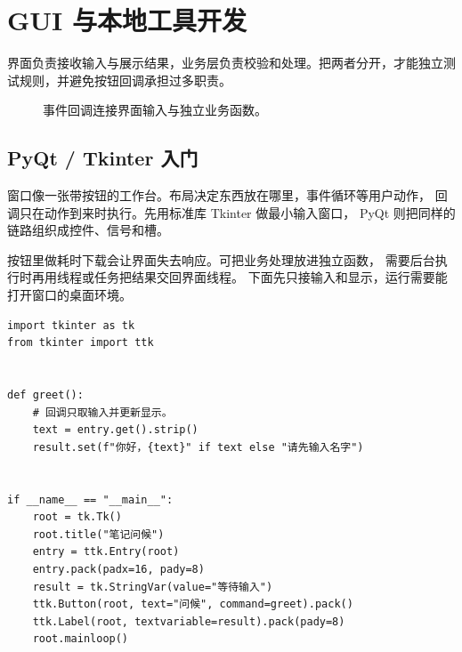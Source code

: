 \chapter{GUI 与本地工具开发}
\label{ch:15-outline}

界面负责接收输入与展示结果，业务层负责校验和处理。把两者分开，才能独立测试规则，并避免按钮回调承担过多职责。


\begin{figure}[htbp]
  \centering
  \caption*{事件回调连接界面输入与独立业务函数。}
\end{figure}


\section{PyQt / Tkinter 入门}

窗口像一张带按钮的工作台。布局决定东西放在哪里，事件循环等用户动作，
回调只在动作到来时执行。先用标准库 Tkinter 做最小输入窗口，
PyQt 则把同样的链路组织成控件、信号和槽。

按钮里做耗时下载会让界面失去响应。可把业务处理放进独立函数，
需要后台执行时再用线程或任务把结果交回界面线程。
下面先只接输入和显示，运行需要能打开窗口的桌面环境。


\begin{lstlisting}[title={\code{window_demo.py}}]
import tkinter as tk
from tkinter import ttk


def greet():
    # 回调只取输入并更新显示。
    text = entry.get().strip()
    result.set(f"你好，{text}" if text else "请先输入名字")


if __name__ == "__main__":
    root = tk.Tk()
    root.title("笔记问候")
    entry = ttk.Entry(root)
    entry.pack(padx=16, pady=8)
    result = tk.StringVar(value="等待输入")
    ttk.Button(root, text="问候", command=greet).pack()
    ttk.Label(root, textvariable=result).pack(pady=8)
    root.mainloop()
\end{lstlisting}

